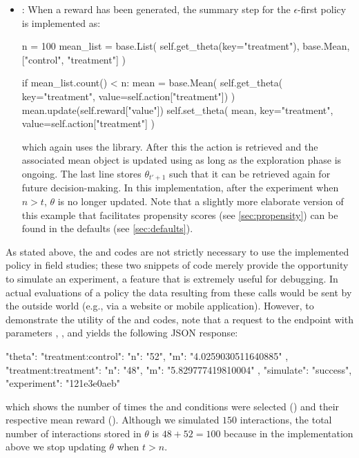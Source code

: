 \documentclass[nojss]{jss}
\begin{document}
\begin{itemize}
\item {}: When a reward has been generated, the summary step for the $\epsilon$-first policy is implemented as:
\begin{Code}
n = 100
mean_list = base.List(
    self.get_theta(key="treatment"), 
    base.Mean, ["control", "treatment"]
    )

if mean_list.count() < n:
    mean = base.Mean(
         self.get_theta(
         key="treatment", value=self.action["treatment"])
         )
    mean.update(self.reward["value"])
    self.set_theta(
         mean, key="treatment", 
         value=self.action["treatment"]
         )
\end{Code}
which again uses the  library. After this the action is retrieved and the associated mean object is updated using  as long as the exploration phase is ongoing. The last line stores $\theta_{t'+1}$ such that it can be retrieved again for future decision-making. In this implementation, after the experiment when $n>t$, $\theta$ is no longer updated. Note that a slightly more elaborate version of this example that facilitates propensity scores (see \ref{sec:propensity}) can be found in the defaults (see
\ref{sec:defaults}).

\end{itemize} 

As stated above, the  and  codes are not strictly necessary to use the implemented policy in field  studies; these two snippets of code merely provide the opportunity to simulate an experiment, a feature that is extremely useful for debugging. In actual evaluations of a policy the data resulting from these calls would be sent by the outside world (e.g., via a website or mobile application). However, to demonstrate the utility of the  and  codes, note that a request to the endpoint  with parameters , , and  yields the following JSON response:
\begin{Code}
{
    "theta": {
        "treatment:control": {
            "n": "52",
            "m": "4.0259030511640885"
        },
        "treatment:treatment": {
            "n": "48",
            "m": "5.829777419810004"
        }
    },
    "simulate": "success",
    "experiment": "121e3e0aeb"
}
\end{Code}
which shows the number of times the  and  conditions were selected () and their respective mean reward (). Although we simulated $150$ interactions, the total number of interactions stored in $\theta$ is $48 + 52 = 100$ because in the implementation above we stop updating $\theta$ when $t>n$.
\end{document}
